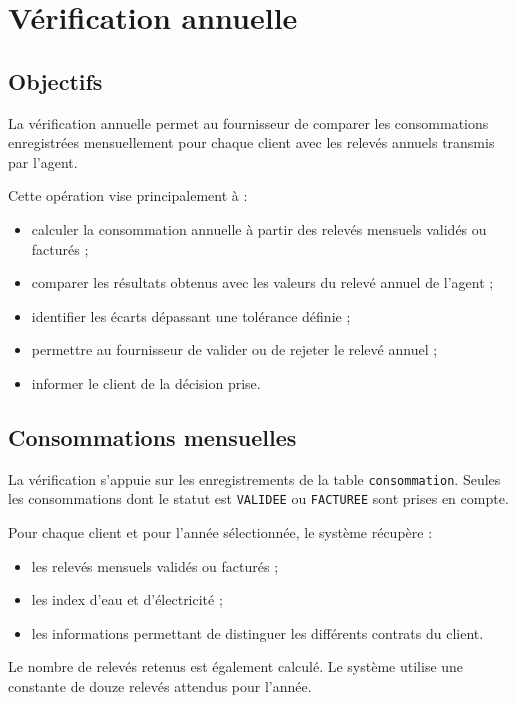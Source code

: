 
\chapter{Vérification annuelle}
\label{chap:verification}

\section{Objectifs}

La vérification annuelle permet au fournisseur de comparer les consommations enregistrées mensuellement pour chaque client avec les relevés annuels transmis par l'agent.

Cette opération vise principalement à :
\begin{itemize}
    \item calculer la consommation annuelle à partir des relevés mensuels validés ou facturés ;
    \item comparer les résultats obtenus avec les valeurs du relevé annuel de l'agent ;
    \item identifier les écarts dépassant une tolérance définie ;
    \item permettre au fournisseur de valider ou de rejeter le relevé annuel ;
    \item informer le client de la décision prise.
\end{itemize}

\section{Consommations mensuelles}

La vérification s'appuie sur les enregistrements de la table \texttt{consommation}. Seules les consommations dont le statut est \texttt{VALIDEE} ou \texttt{FACTUREE} sont prises en compte.

Pour chaque client et pour l'année sélectionnée, le système récupère :
\begin{itemize}
    \item les relevés mensuels validés ou facturés ;
    \item les index d'eau et d'électricité ;
    \item les informations permettant de distinguer les différents contrats du client.
\end{itemize}

Le nombre de relevés retenus est également calculé. Le système utilise une constante de douze relevés attendus pour l'année.

